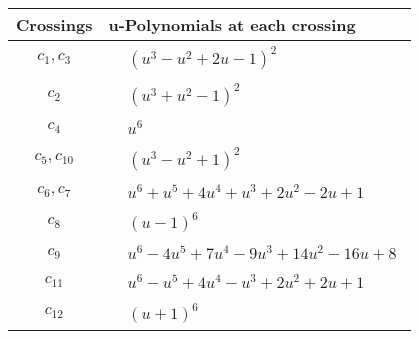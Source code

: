 \documentclass[1p]{elsarticle_modified}
\theoremstyle{definition}
\begin{document}
\begin{tabular}{m{50pt}|m{274pt}}
Crossings & \hspace{64pt}u-Polynomials at each crossing \\
\hline $$\begin{aligned}c_{1},c_{3}\end{aligned}$$&$\begin{aligned}
&(u^3- u^2+2 u-1)^2
\end{aligned}$\\
\hline $$\begin{aligned}c_{2}\end{aligned}$$&$\begin{aligned}
&(u^3+u^2-1)^2
\end{aligned}$\\
\hline $$\begin{aligned}c_{4}\end{aligned}$$&$\begin{aligned}
&u^6
\end{aligned}$\\
\hline $$\begin{aligned}c_{5},c_{10}\end{aligned}$$&$\begin{aligned}
&(u^3- u^2+1)^2
\end{aligned}$\\
\hline $$\begin{aligned}c_{6},c_{7}\end{aligned}$$&$\begin{aligned}
&u^6+u^5+4 u^4+u^3+2 u^2-2 u+1
\end{aligned}$\\
\hline $$\begin{aligned}c_{8}\end{aligned}$$&$\begin{aligned}
&(u-1)^6
\end{aligned}$\\
\hline $$\begin{aligned}c_{9}\end{aligned}$$&$\begin{aligned}
&u^6-4 u^5+7 u^4-9 u^3+14 u^2-16 u+8
\end{aligned}$\\
\hline $$\begin{aligned}c_{11}\end{aligned}$$&$\begin{aligned}
&u^6- u^5+4 u^4- u^3+2 u^2+2 u+1
\end{aligned}$\\
\hline $$\begin{aligned}c_{12}\end{aligned}$$&$\begin{aligned}
&(u+1)^6
\end{aligned}$\\
\hline
\end{tabular}\\~\\
\end{document}
